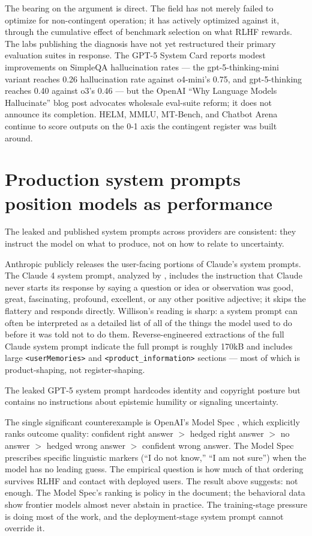 \documentclass[11pt]{article}
\begin{document}
The bearing on the argument is direct. The field has not merely failed
to optimize for non-contingent operation; it has actively optimized
against it, through the cumulative effect of benchmark selection on
what RLHF rewards. The labs publishing the diagnosis have not yet
restructured their primary evaluation suites in response. The GPT-5
System Card \cite{openai2026gpt5} reports modest improvements on
SimpleQA hallucination rates --- the gpt-5-thinking-mini variant
reaches 0.26 hallucination rate against o4-mini's 0.75, and
gpt-5-thinking reaches 0.40 against o3's 0.46 --- but the OpenAI
``Why Language Models Hallucinate'' blog post advocates wholesale
eval-suite reform; it does not announce its completion. HELM, MMLU,
MT-Bench, and Chatbot Arena continue to score outputs on the 0-1 axis
the contingent register was built around.

\section{Production system prompts position models as performance}

The leaked and published system prompts across providers are
consistent: they instruct the model on what to produce, not on how to
relate to uncertainty.

Anthropic publicly releases the user-facing portions of Claude's system
prompts. The Claude 4 system prompt, analyzed by
\cite{willison2025claude4}, includes the instruction that Claude
never starts its response by saying a question or idea or observation
was good, great, fascinating, profound, excellent, or any other
positive adjective; it skips the flattery and responds directly.
Willison's reading is sharp: a system prompt can often be interpreted
as a detailed list of all of the things the model used to do before it
was told not to do them. Reverse-engineered extractions of the full
Claude system prompt \cite{zep2026claudeprompt} indicate the full
prompt is roughly 170kB and includes large \texttt{<userMemories>} and
\texttt{<product\_information>} sections --- most of which is
product-shaping, not register-shaping.

The leaked GPT-5 system prompt \cite{gupta2025gpt5prompt} hardcodes
identity and copyright posture but contains no instructions about
epistemic humility or signaling uncertainty.

The single significant counterexample is OpenAI's Model Spec
\cite{openai2024modelspec}, which explicitly ranks outcome quality:
confident right answer $>$ hedged right answer $>$ no answer $>$ hedged
wrong answer $>$ confident wrong answer. The Model Spec prescribes
specific linguistic markers (``I do not know,'' ``I am not sure'')
when the model has no leading guess. The empirical question is how
much of that ordering survives RLHF and contact with deployed users.
The \cite{mohamadi2025honesty} result above suggests: not enough. The
Model Spec's ranking is policy in the document; the behavioral data
show frontier models almost never abstain in practice. The
training-stage pressure \cite{kalai2025hallucinate} is doing most of
the work, and the deployment-stage system prompt cannot override it.
\end{document}
